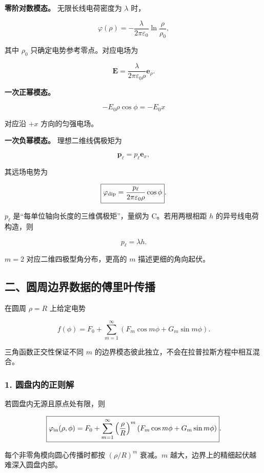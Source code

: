\textbf{零阶对数模态。} 无限长线电荷密度为 \(\lambda\) 时，

\[
\boxed{
\varphi(\rho)
=-\frac{\lambda}{2\pi\varepsilon_0}
\ln\frac{\rho}{\rho_0}
},
\]

其中 \(\rho_0\) 只确定电势参考零点。对应电场为

\[
\mathbf E
=\frac{\lambda}{2\pi\varepsilon_0\rho}\mathbf e_{\rho}.
\]

\textbf{一次正幂模态。}

\[
-E_0\rho\cos\phi=-E_0x
\]

对应沿 \(+x\) 方向的匀强电场。

\textbf{一次负幂模态。} 理想二维线偶极矩为

\[
\mathbf p_{\ell}=p_{\ell}\mathbf e_x,
\]

其远场电势为

\[
\boxed{
\varphi_{\rm dip}
=\frac{p_{\ell}}{2\pi\varepsilon_0\rho}\cos\phi
}.
\]

\(p_{\ell}\) 是``每单位轴向长度的三维偶极矩''，量纲为
\(\mathrm C\)。若用两根相距 \(h\) 的异号线电荷构造，则

\[
p_{\ell}=\lambda h.
\]

\(m=2\) 对应二维四极型角分布，更高的 \(m\) 描述更细的角向起伏。

\subsection{二、圆周边界数据的傅里叶传播}\label{m2:ux4e8cux5706ux5468ux8fb9ux754cux6570ux636eux7684ux5085ux91ccux53f6ux4f20ux64ad}

在圆周 \(\rho=R\) 上给定电势

\[
f(\phi)
=F_0+\sum_{m=1}^{\infty}
\left(
F_m\cos m\phi+G_m\sin m\phi
\right).
\]

三角函数正交性保证不同 \(m\)
的边界模态彼此独立，不会在拉普拉斯方程中相互混合。

\subsubsection{1.
圆盘内的正则解}\label{m2:ux5706ux76d8ux5185ux7684ux6b63ux5219ux89e3}

若圆盘内无源且原点处有限，则

\[
\boxed{
\varphi_{\rm in}(\rho,\phi)
=F_0+\sum_{m=1}^{\infty}
\left(\frac{\rho}{R}\right)^m
\left(
F_m\cos m\phi+G_m\sin m\phi
\right)
}.
\]

每个非零角模向圆心传播时都按 \((\rho/R)^m\) 衰减。\(m\)
越大，边界上的精细起伏越难深入圆盘内部。

